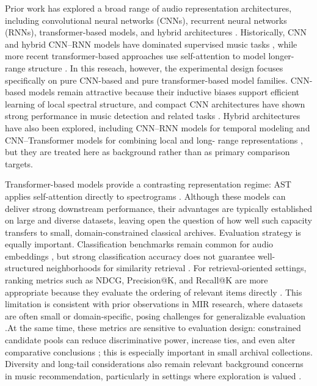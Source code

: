 \documentclass{article}
\begin{document}
Prior work has explored a broad range of audio representation architectures, including convolutional
neural networks (CNNs), recurrent neural networks (RNNs), transformer-based models, and hybrid
architectures \cite{zaman2023}. Historically, CNN and hybrid CNN–RNN models have dominated supervised
music tasks \cite{jiang2024}, while more recent transformer-based approaches use self-attention to
model longer-range structure \cite{zaman2023}. In this reseach, however, the experimental design
focuses specifically on pure CNN-based and pure transformer-based model families.
CNN-based models remain attractive because their inductive biases support efficient learning of local
spectral structure, and compact CNN architectures have shown strong performance in music detection
and related tasks \cite{kong2020panns}. Hybrid architectures have also been explored, including CNN–RNN
models for temporal modeling \cite{lin2024} and CNN–Transformer models for combining local and long-
range representations \cite{pourmoazemi2024}, but they are treated here as background rather than as
primary comparison targets.

Transformer-based models provide a contrasting representation regime: AST applies self-attention
directly to spectrograms \cite{gong2021ast}. Although these models can deliver strong downstream
performance, their advantages are typically established on large and diverse datasets, leaving open
the question of how well such capacity transfers to small, domain-constrained classical archives.
Evaluation strategy is equally important. Classification benchmarks remain common for audio
embeddings \cite{gong2021ast, zaman2023}, but strong classification accuracy does not guarantee well-
structured neighborhoods for similarity retrieval \cite{tamm2024}. For retrieval-oriented settings,
ranking metrics such as NDCG, Precision@K, and Recall@K are more appropriate because they evaluate
the ordering of relevant items directly \cite{krichene2020}. This limitation is consistent with 
prior observations in MIR research, where datasets are often small or domain-specific, posing challenges 
for generalizable evaluation \cite{urbano2013}.At the same time, these metrics are
sensitive to evaluation design: constrained candidate pools can reduce discriminative power, increase
ties, and even alter comparative conclusions \cite{krichene2020, canamares2020}; this is especially
important in small archival collections. Diversity and long-tail considerations also remain relevant
background concerns in music recommendation, particularly in settings where exploration is valued
\cite{porcaro2022}.
\end{document}
